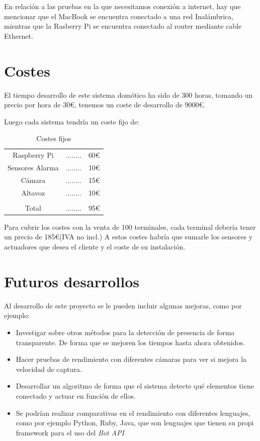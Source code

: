 \documentclass[10pt,journal,compsoc]{IEEEtran}
\begin{document}
En relación a las pruebas en la que necesitamos conexión a internet, 
hay que mencionar que el MacBook se encuentra conectado a una red Inalámbrica, 
mientras que la Rasberry Pi se encuentra conectado al router mediante cable Ethernet. 

\section{Costes}
El tiempo desarrollo de este sistema domótico ha sido de 300 horas, tomando un 
precio por hora de 30\euro, tenemos un coste de desarrollo de 9000\euro.

Luego cada sistema tendría un coste fijo de:
\begin{table}[h]
\centering
\begin{tabular}{ccc}
Raspberry Pi & ........ & 60\euro \\
Sensores Alarma & ........ & 10\euro \\
Cámara & ........ & 15\euro \\
Altavoz & ........ & 10\euro \\
\hline \\
Total & ........ & 95\euro \\
\end{tabular} 
\caption{Costes fijos}
\label{tab:CostesFij}
\end{table}

Para cubrir los costes con la venta de 100 terminales, cada terminal debería tener un precio de 
185\euro (IVA no incl.)
A estos costes habría que sumarle los sensores y actuadores que desea el cliente y el coste 
de su instalación.

\section{Futuros desarrollos}
Al desarrollo de este proyecto se le pueden incluir algunas mejoras, como por 
ejemplo:
\begin{itemize}
  \item Investigar sobre otros métodos para la detección de presencia de forma 
  transparente. De forma que se mejoren los tiempos hasta ahora obtenidos.
  \item Hacer pruebas de rendimiento con diferentes cámaras para ver si mejora 
  la velocidad de captura.
  \item Desarrollar un algoritmo de forma que el sistema detecte qué elementos 
  tiene conectado y actuar en función de ellos.
  \item Se podrían realizar comparativas en el rendimiento con diferentes 
  lenguajes, como por ejemplo Python, Ruby, Java, que son lenguajes que tienen 
  su propi framework para el uso del \textit{Bot API}
\end{itemize}
\end{document}
